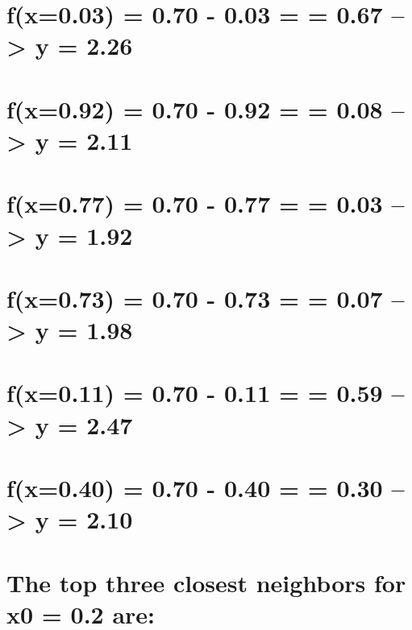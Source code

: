 \documentclass[
  letterpaper,
  DIV=11,
  numbers=noendperiod]{scrreprt}
\begin{document}
{

\chapter{f(x=0.03) = 0.70 - 0.03 = \textbar{} = 0.67
--\textgreater{} y = 2.26}\label{fx0.03-0.70---0.03-0.67-0.67-y-2.26}


\chapter{f(x=0.92) = 0.70 - 0.92 = \textbar{} = 0.08
--\textgreater{} y = 2.11}\label{fx0.92-0.70---0.92--0.08-0.08-y-2.11}


\chapter{f(x=0.77) = 0.70 - 0.77 = \textbar{} = 0.03
--\textgreater{} y = 1.92}\label{fx0.77-0.70---0.77--0.03-0.03-y-1.92}


\chapter{f(x=0.73) = 0.70 - 0.73 = \textbar{} = 0.07
--\textgreater{} y = 1.98}\label{fx0.73-0.70---0.73--0.07-0.07-y-1.98}


\chapter{f(x=0.11) = 0.70 - 0.11 = \textbar{} = 0.59
--\textgreater{} y = 2.47}\label{fx0.11-0.70---0.11-0.59-0.59-y-2.47}


\chapter{f(x=0.40) = 0.70 - 0.40 = \textbar{} = 0.30
--\textgreater{} y = 2.10}\label{fx0.40-0.70---0.40-0.30-0.30-y-2.10}


\chapter{The top three closest neighbors for x0 = 0.2
are:}\label{the-top-three-closest-neighbors-for-x0-0.2-are}

}
\end{document}
